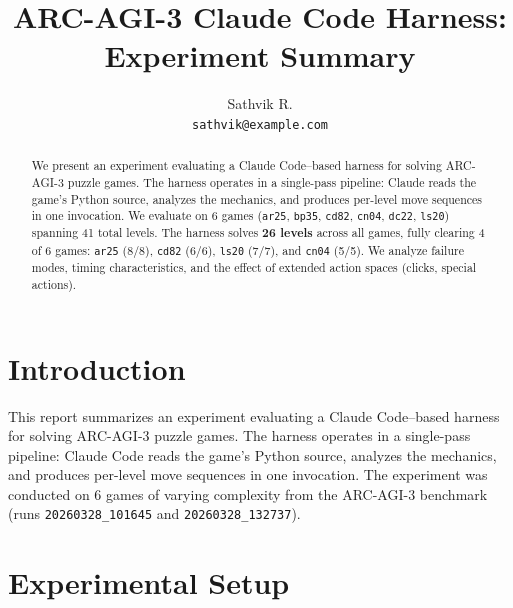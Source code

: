 \documentclass{article}
\title{ARC-AGI-3 Claude Code Harness: Experiment Summary}
\author{
  Sathvik R. \\
  \texttt{sathvik@example.com}
}
\begin{document}
\maketitle

\begin{abstract}
We present an experiment evaluating a Claude Code--based harness for solving ARC-AGI-3 puzzle games.
The harness operates in a single-pass pipeline: Claude reads the game's Python source, analyzes the mechanics, and produces per-level move sequences in one invocation.
We evaluate on 6 games (\texttt{ar25}, \texttt{bp35}, \texttt{cd82}, \texttt{cn04}, \texttt{dc22}, \texttt{ls20}) spanning 41 total levels.
The harness solves \textbf{26 levels} across all games, fully clearing 4 of 6 games: \texttt{ar25} (8/8), \texttt{cd82} (6/6), \texttt{ls20} (7/7), and \texttt{cn04} (5/5).
We analyze failure modes, timing characteristics, and the effect of extended action spaces (clicks, special actions).
\end{abstract}

\section{Introduction}

This report summarizes an experiment evaluating a Claude Code--based harness for solving ARC-AGI-3 puzzle games.
The harness operates in a single-pass pipeline: Claude Code reads the game's Python source, analyzes the mechanics, and produces per-level move sequences in one invocation.
The experiment was conducted on 6 games of varying complexity from the ARC-AGI-3 benchmark (runs \texttt{20260328\_101645} and \texttt{20260328\_132737}).

\section{Experimental Setup}
\end{document}
